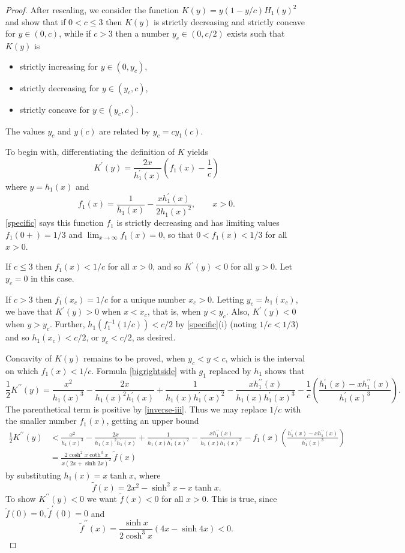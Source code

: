 \documentclass[12pt,reqno]{amsart}
\theoremstyle{definition}
\newcommand{\ho}{H_1}
\begin{document}
\begin{proof}
After rescaling, we consider the function $K(y) = y(1-y/c)\ho(y)^2$ and show that if $0 < c \leq 3$ then $K(y)$ is strictly decreasing and strictly concave for $y \in (0,c)$, while if $c>3$ then a number $y_c \in (0,c/2)$ exists such that $K(y)$ is 
%
\begin{itemize}
\item strictly increasing for $y \in (0, y_c)$, 
\item strictly decreasing for $y \in (y_c,c)$, 
\item strictly concave for $y \in (y_c,c)$. 
\end{itemize}
%
The values $y_c$ and $y(c)$ are related by $y_c = c y_1(c)$. 

To begin with, differentiating the definition of $K$ yields
\[
K^\prime(y) = \frac{2x}{h_1^\prime(x)} \left( f_1(x) - \frac{1}{c} \right) 
\]
where $y=h_1(x)$ and 
\[
f_1(x) = \frac{1}{h_1(x)} - \frac{x h_1^\prime(x)}{2h_1(x)^2} , \qquad x>0 .
\]
\autoref{specific} says this function $f_1$ is strictly decreasing and has limiting values $f_1(0+)=1/3$ and $\lim_{x \to \infty} f_1(x)=0$, so that $0<f_1(x)<1/3$ for all $x>0$.

If $c \leq 3$ then $f_1(x)<1/c$ for all $x>0$, and so $K^\prime(y)<0$ for all $y>0$. Let $y_c=0$ in this case. 

If $c>3$ then $f_1(x_c) = 1/c$ for a unique number $x_c>0$. Letting $y_c=h_1(x_c)$, we have that $K^\prime(y)>0$ when $x<x_c$, that is, when $y<y_c$. Also, $K^\prime(y)<0$ when $y>y_c$. Further, $h_1(f_1^{-1}(1/c))<c/2$ by \autoref{specific}(i) (noting $1/c < 1/3$) and so $h_1(x_c) < c/2$, or $y_c<c/2$, as desired.

Concavity of $K(y)$ remains to be proved, when $y_c < y < c$, which is the interval on which $f_1(x)<1/c$. Formula \autoref{bigrightside} with $g_1$ replaced by $h_1$ shows that 
\[
\frac{1}{2} K^{\prime \prime}(y) = 
\frac{x^2}{h_1(x)^3} - \frac{2 x}{h_1(x)^2 h_1^\prime(x)} + \frac{1}{h_1(x) h_1^\prime(x)^2} - \frac{x h_1^{\prime \prime}(x)}{h_1(x) h_1^\prime(x)^3} - \frac{1}{c} \left( \frac{h_1^\prime(x) - x h_1^{\prime \prime}(x)}{h_1^\prime(x)^3} \right) . 
\]
The parenthetical term is positive by \eqref{inverse-iii}. Thus we may replace $1/c$ with the smaller number $f_1(x)$, getting an upper bound 
%
\begin{align*}
\frac{1}{2} K^{\prime \prime}(y) 
& < \frac{x^2}{h_1(x)^3} - \frac{2 x}{h_1(x)^2 h_1^\prime(x)} + \frac{1}{h_1(x) h_1^\prime(x)^2} - \frac{x h_1^{\prime \prime}(x)}{h_1(x) h_1^\prime(x)^3} - f_1(x) \left( \frac{h_1^\prime(x) - x h_1^{\prime \prime}(x)}{h_1^\prime(x)^3} \right) \\
& = \frac{2\cosh^2 x \coth^3 x}{x(2x + \sinh 2x)^2} \, \tilde{f}(x)
\end{align*}
%
by substituting $h_1(x)=x \tanh x$, where 
\[
\tilde{f}(x) = 2x^2-\sinh^2 x - x \tanh x .
\]
To show $K^{\prime \prime}(y)<0$ we want $\tilde{f}(x)<0$ for all $x>0$. This is true, since $\tilde{f}(0)=0,\tilde{f}^\prime(0)=0$ and 
\[
\tilde{f}^{\prime \prime}(x) = \frac{\sinh x}{2\cosh^3 x} (4x - \sinh 4x) < 0.
\]
\end{proof}
%
\end{document}
